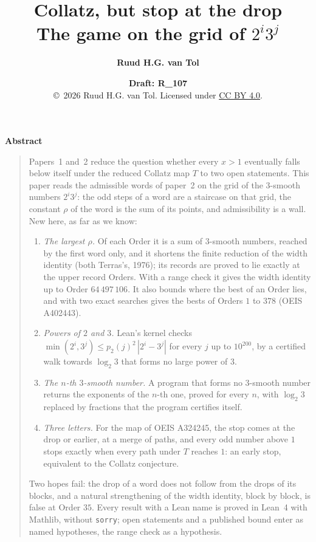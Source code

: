 \documentclass[10pt,a4paper,titlepage]{article}
\title{\textbf{Collatz, but stop at the drop}\\[0.5ex]
  \Large The game on the grid of $2^i 3^j$}
\author{\textbf{Ruud H.G. van Tol}}
\date{\textbf{Draft: R\_107}\\[8ex]
  {\small\copyright\ 2026 Ruud H.G. van Tol. Licensed under \href{https://creativecommons.org/licenses/by/4.0/}{CC BY 4.0}.}}  %
\begin{document}
\maketitle

\bigskip
\begin{center}\textbf{Abstract}\end{center}
\begin{quotation}\small\noindent
Papers~1 and~2 reduce the question whether every $x > 1$ eventually falls below itself
under the reduced Collatz map $T$ to two open statements. This paper reads the admissible
words of paper~2 on the grid of the $3$-smooth numbers $2^i 3^j$: the odd steps of a word
are a staircase on that grid, the constant $\rho$ of the word is the sum of its points,
and admissibility is a wall. New here, as far as we know:

\begin{enumerate}\setlength{\itemsep}{0.3ex}
\item \emph{The largest $\rho$.} Of each Order it is a sum of $3$-smooth numbers, reached by
  the first word only, and it shortens the finite reduction of the width identity (both
  Terras's, 1976); its records are proved to lie exactly at the upper record Orders. With a range check it gives the width identity up to
  Order $64\,497\,106$. It also bounds where the best of an Order lies, and with two exact
  searches gives the bests of Orders $1$ to $378$ (OEIS A402443).
\item \emph{Powers of $2$ and $3$.} Lean's kernel checks
  $\min(2^i, 3^j) \le p_2(j)^2\,|2^i - 3^j|$ for every $j$ up to $10^{200}$, by a certified
  walk towards $\log_2 3$ that forms no large power of $3$.
\item \emph{The $n$-th $3$-smooth number.} A program that forms no $3$-smooth number
  returns the exponents of the $n$-th one, proved for every $n$, with $\log_2 3$ replaced by
  fractions that the program certifies itself.
\item \emph{Three letters.} For the map of OEIS A324245, the stop comes at the drop or
  earlier, at a merge of paths, and every odd number above $1$ stops exactly when every
  path under $T$ reaches $1$: an early stop, equivalent to the Collatz conjecture.
\end{enumerate}

\noindent
Two hopes fail: the drop of a word does not follow from the drops of its blocks, and a
natural strengthening of the width identity, block by block, is false at Order $35$.
Every result with a Lean name is proved in Lean~4 with Mathlib, without \texttt{sorry};
open statements and a published bound enter as named hypotheses, the range check as a
hypothesis.
\end{quotation}
\end{document}

